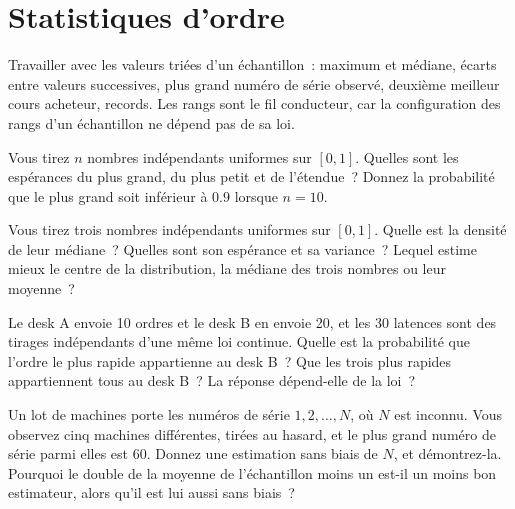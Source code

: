 \chapter{Statistiques d'ordre}\label{ch:iv1:order-statistics}

\begin{ivtrains}
Travailler avec les valeurs triées d'un échantillon~: maximum et médiane, écarts entre valeurs successives, plus grand numéro de série observé, deuxième meilleur cours acheteur, records. Les rangs sont le fil conducteur, car la configuration des rangs d'un échantillon ne dépend pas de sa loi.
\end{ivtrains}

\begin{question}\label{iq:iv1:order-statistics:1}
Vous tirez $n$ nombres indépendants uniformes sur $[0, 1]$. Quelles sont les espérances du plus grand, du plus petit et de l'étendue~? Donnez la probabilité que le plus grand soit inférieur à $0.9$ lorsque $n = 10$.
\end{question}

\begin{question}\label{iq:iv1:order-statistics:2}
Vous tirez trois nombres indépendants uniformes sur $[0, 1]$. Quelle est la densité de leur médiane~? Quelles sont son espérance et sa variance~? Lequel estime mieux le centre de la distribution, la médiane des trois nombres ou leur moyenne~?
\end{question}

\begin{question}\label{iq:iv1:order-statistics:3}
Le desk A envoie 10 ordres et le desk B en envoie 20, et les 30 latences sont des tirages indépendants d'une même loi continue. Quelle est la probabilité que l'ordre le plus rapide appartienne au desk B~? Que les trois plus rapides appartiennent tous au desk B~? La réponse dépend-elle de la loi~?
\end{question}

\begin{question}\label{iq:iv1:order-statistics:4}
Un lot de machines porte les numéros de série $1, 2, \dots, N$, où $N$ est inconnu. Vous observez cinq machines différentes, tirées au hasard, et le plus grand numéro de série parmi elles est 60. Donnez une estimation sans biais de $N$, et démontrez-la. Pourquoi le double de la moyenne de l'échantillon moins un est-il un moins bon estimateur, alors qu'il est lui aussi sans biais~?
\end{question}

